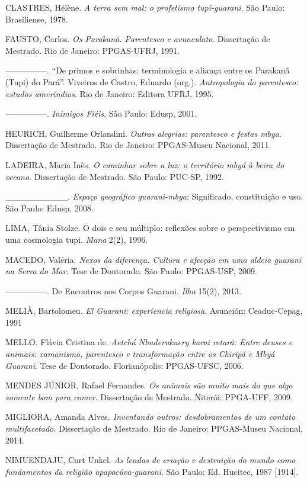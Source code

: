 CLASTRES, Hélène. \emph{A terra sem mal: o profetismo tupi-guarani}. São
Paulo: Brasiliense, 1978.

FAUSTO, Carlos. \emph{Os Parakanã. Parentesco e avunculato}. Dissertação
de Mestrado. Rio de Janeiro: PPGAS-UFRJ, 1991.

---------------. ``De primos e sobrinhas: terminologia e aliança entre
os Parakanã (Tupi) do Pará''. Viveiros de Castro, Eduardo (org.).
\emph{Antropologia do parentesco: estudos ameríndios}. Rio de Janeiro:
Editora UFRJ, 1995.

---------------. \emph{Inimigos Fiéis}. São Paulo: Edusp, 2001.

HEURICH, Guilherme Orlandini. \emph{Outras alegrias: parentesco e festas
mbya}. Dissertação de Mestrado. Rio de Janeiro: PPGAS-Museu Nacional,
2011.

LADEIRA, Maria Inês. \emph{O caminhar sobre a luz: o território mbyá à
beira do oceano}. Dissertação de Mestrado. São Paulo: PUC-SP, 1992.

\_\_\_\_\_\_\_\_\_\_. \emph{Espaço geográfico guarani-mbya}:
Significado, constituição e uso. São Paulo: Edusp, 2008.

LIMA, Tânia Stolze. O dois e seu múltiplo: reflexões sobre o
perspectivismo em uma cosmologia tupi. \emph{Mana} 2(2), 1996.

MACEDO, Valéria. \emph{Nexos da diferença. Cultura e afecção em uma
aldeia guarani na Serra do Mar}. Tese de Doutorado. São Paulo:
PPGAS-USP, 2009.

---------------. De Encontros nos Corpos Guarani. \emph{Ilha} 15(2),
2013.

MELIÀ, Bartolomeu. \emph{El Guarani: experiencia religiosa}. Asunción:
Ceaduc-Cepag, 1991

MELLO, Flávia Cristina de. \emph{Aetchá Nhaderukuery karai retarã: Entre
deuses e animais: xamanismo, parentesco e transformação entre os Chiripá
e Mbyá Guarani}. Tese de Doutorado. Florianópolis: PPGAS-UFSC, 2006.

MENDES JÚNIOR, Rafael Fernandes. \emph{Os animais são muito mais do que
algo somente bom para comer}. Dissertação de Mestrado. Niterói:
PPGA-UFF, 2009.

MIGLIORA, Amanda Alves\emph{. Inventando outros: desdobramentos de um
contato multifacetado.} Dissertação de Mestrado. Rio de Janeiro:
PPGAS-Museu Nacional, 2014.

NIMUENDAJU, Curt Unkel. \emph{As lendas de criação e destruição do mundo
como fundamentos da religião apapocúva-guarani}. São Paulo: Ed. Hucitec,
1987 {[}1914{]}.

